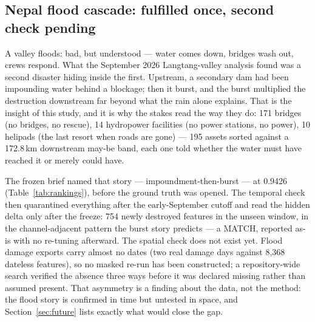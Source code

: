 \documentclass[11pt]{article}
\begin{document}
\subsection{Nepal flood cascade: fulfilled once, second check pending}

A valley floods: bad, but understood --- water comes down, bridges wash out,
crews respond. What the September 2026 Langtang-valley analysis found was a
second disaster hiding inside the first. Upstream, a secondary dam had been
impounding water behind a blockage; then it burst, and the burst multiplied
the destruction downstream far beyond what the rain alone explains. That is
the insight of this study, and it is why the stakes read the way they do:
171 bridges (no bridges, no rescue), 14 hydropower facilities (no power
stations, no power), 10 helipads (the last resort when roads are gone) ---
195 assets sorted against a 172.8\,km downstream may-be band, each one told
whether the water must have reached it or merely could have.

The frozen brief named that story --- impoundment-then-burst --- at 0.9426
(Table~\ref{tab:rankings}), before the ground truth was opened. The temporal
check then quarantined everything after the early-September cutoff and read
the hidden delta only after the freeze: 754 newly destroyed features in the
unseen window, in the channel-adjacent pattern the burst story predicts ---
a MATCH, reported as-is with no re-tuning afterward. The spatial check does
not exist yet. Flood damage exports carry almost no dates (two real damage
days against 8,368 dateless features), so no masked re-run has been
constructed; a repository-wide search verified the absence three ways before
it was declared missing rather than assumed present. That asymmetry is a
finding about the data, not the method: the flood story is confirmed in time
but untested in space, and Section~\ref{sec:future} lists exactly what would
close the gap.
\end{document}
